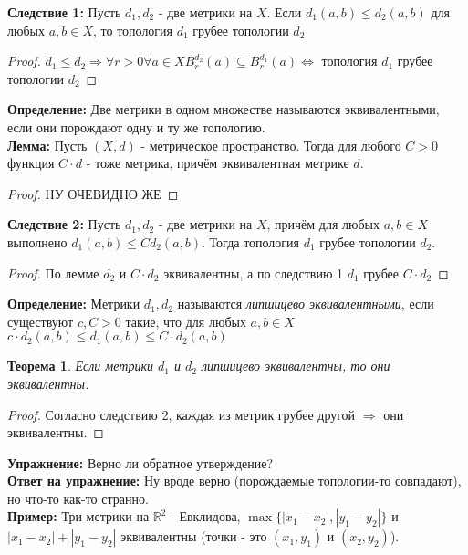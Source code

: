 \documentclass[a4paper,100pt]{article}
\theoremstyle{indented}
\newtheorem{theorem}{Теорема}
\begin{document}
\textbf{Следствие 1:} Пусть $d_1, d_2$ - две метрики на $X$. Если $d_1(a, b) \leq d_2(a, b)$ для любых $a, b \in X$, то топология $d_1$ грубее топологии $d_2$

\begin{proof} $d_1 \leq d_2 \Rightarrow \forall r > 0 \forall a \in X B_r^{d_2}(a) \subseteq B_r^{d_1}(a) \Longleftrightarrow$ топология $d_1$ грубее топологии $d_2$
\end{proof}

\textbf{Определение:} Две метрики в одном множестве называются эквивалентными, если они порождают одну и ту же топологию.
\\

\textbf{Лемма: } Пусть $(X, d)$ - метрическое пространство. Тогда для любого $C>0$ функция $C \cdot d$ - тоже метрика, причём эквивалентная метрике $d$.

\begin{proof} НУ ОЧЕВИДНО ЖЕ
\end{proof}

\textbf{Следствие 2:} Пусть $d_1, d_2$ - две метрики на $X$, причём для любых $a, b \in X$ выполнено $d_1(a, b) \leq Cd_2(a, b)$. Тогда топология $d_1$ грубее топологии $d_2$.

\begin{proof} По лемме $d_2$ и $C \cdot d_2$ эквивалентны, а по следствию 1 $d_1$ грубее $C \cdot d_2$
\end{proof}

\textbf{Определение: } Метрики $d_1, d_2$ называются \textit{липшицево эквивалентными}, если существуют $c, C > 0$ такие, что для любых $a, b \in X$ $c \cdot d_2(a, b) \leq d_1(a, b) \leq C \cdot d_2(a, b)$
\\
\begin{theorem}
Если метрики $d_1$ и $d_2$ липшицево эквивалентны, то они эквивалентны.
\end{theorem}

\begin{proof} Согласно следствию 2, каждая из метрик грубее другой $\Rightarrow$ они эквивалентны.
\end{proof}
 
\textbf{Упражнение:} Верно ли обратное утверждение?
\\

\textbf{Ответ на упражнение: } Ну вроде верно (порождаемые топологии-то совпадают), но что-то как-то странно.
\\

\textbf{Пример: } Три метрики на $\mathbb{R}^2$ - Евклидова, $\max\{|x_1-x_2|, |y_1-y_2|\}$ и $|x_1-x_2|+|y_1-y_2|$ эквивалентны (точки - это $(x_1, y_1)$ и $(x_2, y_2)$).
\end{document}
